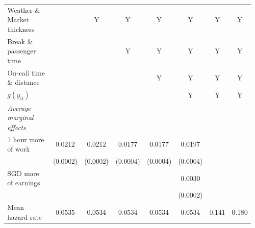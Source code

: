 \documentclass[reviewmode,AEJ]{AEA}
\begin{document}
\begin{table}[htb]
{\begin{tabularx}{\textwidth}{l@{\extracolsep{\fill}}*{7}{S[table-format = 0.4, table-space-text-pre={**}, table-space-text-post={-**}]}}
			\addlinespace
			Weather \& Market thickness     & {}                      & {Y}                     & {Y}                     & {Y}                     & {Y}                     &  {Y} &{Y}                          \\
			Break \& passenger time         & {}                      & {}                      & {Y}                     & {Y}                     & {Y}                     &  {Y}                             &    {Y}                           \\
			On-call time \& distance        & {}                      & {}                      & {}                      & {Y}                     & {Y}                     & {Y}                              &    {Y}                           \\
			\(g(y_{it})\)                   & {}                      & {}                      & {}                      & {}                      & {Y}                     &    {Y}                           &     {Y}                          \\ \midrule
			\textit{Average marginal effects}            &                         &                         &                         &                         &                         &                               &                        \\
			1 hour more of work             & 0.0212\sym{***}         & 0.0212\sym{***}         & 0.0177\sym{***}         & 0.0177\sym{***}         & 0.0197\sym{***}         &                               &                               \\
			                                & (0.0002)                & (0.0002)                & (0.0004)                & (0.0004)                & (0.0004)                &                               &                         \\
			 SGD more of earnings         &                         &                         &                         &                         & 0.0030\sym{***}         &                               &                               \\
			                                &                         &                         &                         &                         & (0.0002)                &                               &                         \\ 
		   \midrule
			Mean hazard rate                & 0.0535                  & 0.0534                  & 0.0534                  & 0.0534                  & 0.0534                  & \num{0.141}                   & \num{0.180}                   \\

\end{tabularx}}
\end{table}
\end{document}
